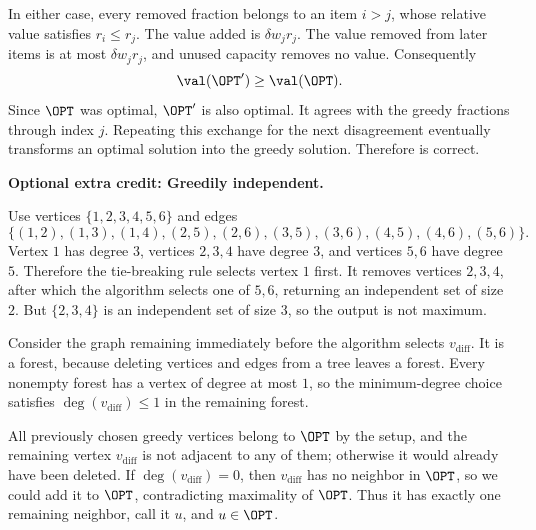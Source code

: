 \documentclass[11pt,addpoints,answers]{exam}
\begin{document}
\begin{questions}
\begin{parts}
\begin{solution}
    In either case, every removed fraction belongs to an item $i>j$, whose
    relative value satisfies $r_i\le r_j$.  The value added is
    $\delta w_jr_j$.  The value removed from later items is at most
    $\delta w_jr_j$, and unused capacity removes no value.  Consequently
    \[
       \val(\OPT')\ge\val(\OPT).
    \]
    Since $\OPT$ was optimal, $\OPT'$ is also optimal.  It agrees with the
    greedy fractions through index $j$.  Repeating this exchange for the next
    disagreement eventually transforms an optimal solution into the greedy
    solution.  Therefore  is correct.
    \end{solution}
  \end{parts}

\bonusquestion \textbf{Optional extra credit: Greedily independent.}
\nopagebreak

  \begin{parts}
    \bonuspart[1]
    \begin{solution}
    Use vertices $\{1,2,3,4,5,6\}$ and edges
    \[
      \{(1,2),(1,3),(1,4),
        (2,5),(2,6),(3,5),(3,6),(4,5),(4,6),(5,6)\}.
    \]
    Vertex $1$ has degree $3$, vertices $2,3,4$ have degree $3$, and
    vertices $5,6$ have degree $5$.  Therefore the tie-breaking rule selects
    vertex $1$ first.  It removes vertices $2,3,4$, after which the algorithm
    selects one of $5,6$, returning an independent set of size $2$.  But
    $\{2,3,4\}$ is an independent set of size $3$, so the output is not
    maximum.
    \end{solution}

    \bonuspart[2]
    \begin{solution}
    Consider the graph remaining immediately before the algorithm selects
    $v_{\mathrm{diff}}$.  It is a forest, because deleting vertices and edges
    from a tree leaves a forest.  Every nonempty forest has a vertex of
    degree at most $1$, so the minimum-degree choice satisfies
    $\deg(v_{\mathrm{diff}})\le1$ in the remaining forest.

    All previously chosen greedy vertices belong to $\OPT$ by the setup, and
    the remaining vertex $v_{\mathrm{diff}}$ is not adjacent to any of them;
    otherwise it would already have been deleted.  If
    $\deg(v_{\mathrm{diff}})=0$, then $v_{\mathrm{diff}}$ has no neighbor in
    $\OPT$, so we could add it to $\OPT$, contradicting maximality of
    $\OPT$.  Thus it has exactly one remaining neighbor, call it $u$, and
    $u\in\OPT$.


\end{solution}
\end{parts}
\end{questions}
\end{document}

